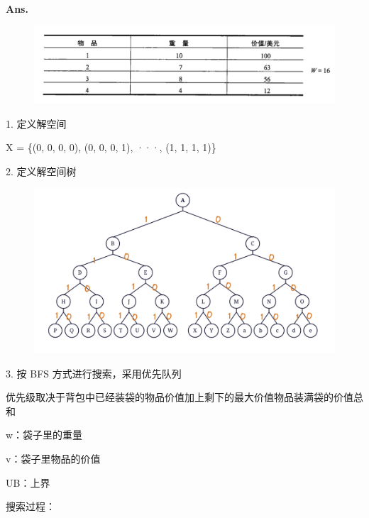 \documentclass[12pt, a4paper, UTF8, fontset=windows]{ctexbook}
\newenvironment{solution}{\par\noindent\textbf{Ans.}}{\par}
\begin{document}
\begin{solution}
    \begin{figure}[h]
        \centering
        \includegraphics[width=12cm]{../../src/images/hw3-Q3.png}
    \end{figure}
    
    1. 定义解空间

    X = \{(0, 0, 0, 0), (0, 0, 0, 1), ···, (1, 1, 1, 1)\}

    2. 定义解空间树

    \begin{figure}[h]
        \centering
        \includegraphics[width=15cm]{../../src/images/hw3-Q3-tree.png}
    \end{figure}


    3. 按 BFS 方式进行搜索，采用优先队列 

    优先级取决于背包中已经装袋的物品价值加上剩下的最大价值物品装满袋的价值总和

    w：袋子里的重量

    v：袋子里物品的价值

    UB：上界

    \newpage

    搜索过程：
    

\end{solution}
\end{document}
